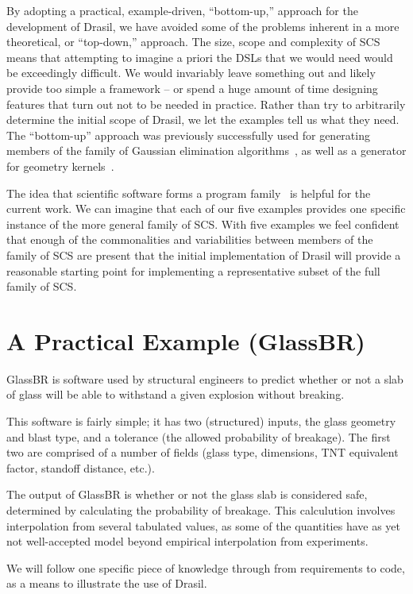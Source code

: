 \documentclass[sigconf]{acmart}
\begin{document}
By adopting a practical, example-driven, ``bottom-up,'' approach for the
development of Drasil, we have avoided some of the problems inherent in a more
theoretical, or ``top-down,'' approach.  The size, scope and complexity of SCS
means that attempting to imagine a priori the DSLs that we would need would be
exceedingly difficult.  We would invariably leave something out and likely
provide too simple a framework -- or spend a huge amount of time designing
features that turn out not to be needed in practice.  Rather than try to
arbitrarily determine the initial scope of Drasil, we let the examples tell us
what they need. The ``bottom-up'' approach was previously successfully used for
generating members of the family of Gaussian elimination
algorithms~\cite{Carette2006}, as well as a generator for geometry
kernels~\cite{CarElShSmi2011}.

The idea that scientific software forms a program
family~\cite{SmithMcCutchanAndCao2007} is helpful for the current work.  We can
imagine that each of our five examples provides one specific instance of the
more general family of SCS.  With five examples we feel confident that enough of
the commonalities and variabilities between members of the family of SCS are
present that the initial implementation of Drasil will provide a reasonable
starting point for implementing a representative subset of the full family of
SCS.

\section{A Practical Example (GlassBR)} \label{SecGlassBR}

GlassBR is software used by structural engineers to predict whether or 
not a slab of glass will be able to withstand a given explosion without
breaking.  

This software is fairly simple; it has two (structured) inputs, the 
glass geometry and blast type, and a tolerance (the allowed probability
of breakage). The first two are comprised of
a number of fields (glass type, dimensions, TNT equivalent factor, 
standoff distance, etc.).

The output of GlassBR is whether or not the glass slab is considered safe,
determined by calculating the probability of breakage.  This calculution involves
interpolation from several tabulated values, as some of the quantities have
as yet not well-accepted model beyond empirical interpolation from experiments.

We will follow one specific piece of knowledge through from requirements to
code, as a means to illustrate the use of Drasil.
\end{document}
